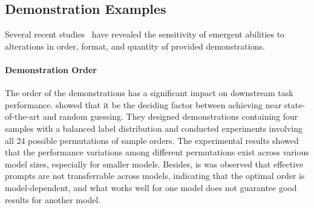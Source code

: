 \subsection{Demonstration Examples}
Several recent  studies~\citep{Liu2021WhatMG,Min2022RethinkingTR,an2023context} have revealed the sensitivity of emergent abilities to alterations in order, format, and quantity of provided demonstrations.
\paragraph{Demonstration Order}
The order of the demonstrations has a significant impact on downstream task performance. \citet{Lu2021FantasticallyOP} showed that it be the deciding factor between achieving near state-of-the-art and random guessing. 
They designed demonstrations containing four samples with a balanced label distribution and conducted experiments involving all 24 possible permutations of sample orders.
The experimental results showed that the performance variations among different permutations exist across various model sizes, especially for smaller models.
Besides, is was observed that effective prompts are not transferrable across models, indicating that the optimal order is model-dependent, and what works well for one model does not guarantee good results for another model.

